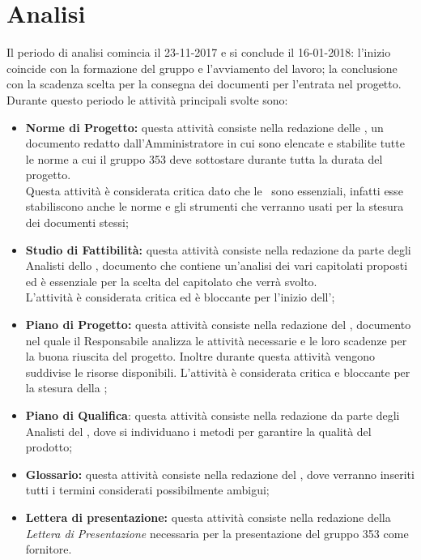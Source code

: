 \documentclass[PianoDiProgetto.tex]{subfiles}
\begin{document}
\section{Analisi}
Il periodo di analisi comincia il 23-11-2017 e si conclude il 16-01-2018: l'inizio coincide con la formazione del gruppo e l'avviamento del lavoro; la conclusione con la scadenza scelta per la consegna dei documenti per l'entrata nel progetto. Durante questo periodo le attività principali svolte sono:
\begin{itemize}
	\item \textbf{Norme di Progetto:} questa attività consiste nella redazione delle \normediprogetto, un documento redatto dall'Amministratore in cui sono elencate e stabilite tutte le norme a cui il gruppo 353 deve sottostare durante tutta la durata del progetto.\\ 
	Questa attività è considerata critica dato che le \normediprogetto\ sono essenziali, infatti esse stabiliscono anche le norme e gli strumenti che verranno usati per la stesura dei documenti stessi;
	\item \textbf{Studio di Fattibilità:} questa attività consiste nella redazione da parte degli Analisti dello \studiodifattibilita, documento che contiene un'analisi dei vari capitolati proposti ed è essenziale per la scelta del capitolato che verrà svolto. \\
	L'attività è considerata critica ed è bloccante per l'inizio dell'\analisideirequisiti;
	\item \textbf{Piano di Progetto:} questa attività consiste nella redazione del \pianodiprogetto, documento nel quale il Responsabile analizza le attività necessarie e le loro scadenze per la buona riuscita del progetto. Inoltre durante questa attività vengono suddivise le risorse disponibili. L'attività è considerata critica e bloccante per la stesura della ;
	\item \textbf{Piano di Qualifica}: questa attività consiste nella redazione da parte degli Analisti del \pianodiqualifica, dove si individuano i metodi per garantire la qualità del prodotto;
	\item \textbf{Glossario:} questa attività consiste nella redazione del \glossario, dove verranno inseriti tutti i termini considerati possibilmente ambigui;
	\item \textbf{Lettera di presentazione:} questa attività consiste nella redazione della \textit{Lettera di Presentazione} necessaria per la presentazione del gruppo 353 come fornitore. 	
\end{itemize}	
\end{document}

